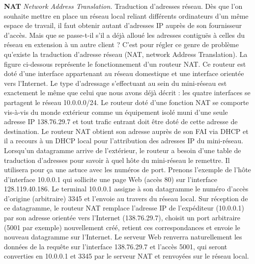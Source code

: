 \textbf{NAT} \textit{Network Address Translation.} Traduction d’adresses réseau.
Dès que l’on souhaite mettre en place un réseau local reliant différents ordinateurs
d’un même espace de travail, il faut obtenir autant d’adresses IP auprès de son fournisseur
d’accès. Mais que se passe-t-il s’il a déjà alloué les adresses contiguës à celles du
réseau en extension à un autre client ? C’est pour régler ce genre de problème qu’existe
la traduction d’adresse réseau (NAT, network Address Translation).
La figure ci-dessous représente le fonctionnement d’un routeur NAT. Ce routeur est
doté d’une interface appartenant au réseau domestique et une interface orientée vers
l’Internet. Le type d’adressage s’effectuant au sein du mini-réseau est exactement le
même que celui que nous avons déjà décrit : les quatre interfaces se partagent le réseau
10.0.0.0/24. Le routeur doté d’une fonction NAT se comporte vis-à-vis du monde extérieur
comme un équipement isolé muni d’une seule adresse IP 138.76.29.7 et tout trafic entrant
doit être doté de cette adresse de destination. Le routeur NAT obtient son adresse auprès
de son FAI via DHCP et il a recours à un DHCP local pour l’attribution des adresses IP
du mini-réseau.
Lorsqu’un datagramme arrive de l’extérieur, le routeur a besoin d’une table de traduction
d’adresses pour savoir à quel hôte du mini-réseau le remettre. Il utilisera pour
ça une astuce avec les numéros de port. Prenons l’exemple de l’hôte d’interface 10.0.0.1
qui sollicite une page Web (accès 80) sur l’interface 128.119.40.186. Le terminal 10.0.0.1
assigne à son datagramme le numéro d’accès d’origine (arbitraire) 3345 et l’envoie au travers
du réseau local. Sur réception de ce datagramme, le routeur NAT remplace l’adresse
IP de l’expéditeur (10.0.0.1) par son adresse orientée vers l’Internet (138.76.29.7), choisit
un port arbitraire (5001 par exemple) nouvellement créé, retient ces correspondances et
envoie le nouveau datagramme sur l’Internet. Le serveur Web renverra naturellement les
données de la requête sur l’interface 138.76.29.7 et l’accès 5001, qui seront converties en
10.0.0.1 et 3345 par le serveur NAT et renvoyées sur le réseau local.



